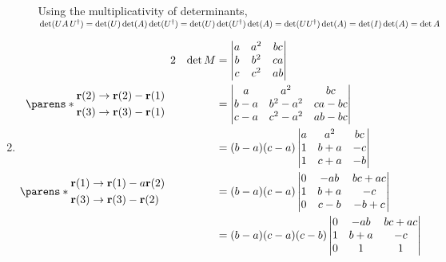 \documentclass[fleqn,a4paper,11pt]{article}
\begin{document}
\begin{enumerate}[label=\textbf{\arabic*.}]
\begin{enumerate}[label=(\roman*)]
      Using the multiplicativity of determinants,
      \(\det(UA\,U^\dag) = \det(U)\det(A)\det(U^\dag)
        = \det(U)\det(U^\dag)\det(A)
        = \det(UU^\dag)\det(A)
        = \det(I) \det(A)
        = \det A
        \)
   \end{enumerate}
  \item
   \begin{alignat*} 2
    && \det M
     &= \begin{vmatrix}
      a & a^2 & bc \\
      b & b^2 & ca \\
      c & c^2 & ab
     \end{vmatrix} \\
    \parens*{
     \begin{aligned}
      \vec r(2) &\to \vec r(2) - \vec r(1) \\
      \vec r(3) &\to \vec r(3) - \vec r(1)
     \end{aligned}} \quad
    && &= \begin{vmatrix}
      a & a^2 & bc \\
      b - a & b^2 - a^2 & ca - bc \\
      c - a & c^2 - a^2 & ab - bc
     \end{vmatrix} \\
    && &= (b - a)(c - a)\begin{vmatrix}
      a & a^2 & bc \\
      1 & b + a & -c \\
      1 & c + a & -b
     \end{vmatrix} \\
    \parens*{
     \begin{aligned}
      \vec r(1) &\to \vec r(1) - a\vec r(2) \\
      \vec r(3) &\to \vec r(3) - \vec r(2)
     \end{aligned}} \quad
    && &= (b - a)(c - a)\begin{vmatrix}
      0 & -ab & bc + ac \\
      1 & b + a & -c \\
      0 & c - b & -b + c
     \end{vmatrix} \\
    && &= (b - a)(c - a)(c - b)\begin{vmatrix}
      0 & -ab & bc + ac \\
      1 & b + a & -c \\
      0 & 1 & 1
     \end{vmatrix} \\

\end{alignat*}
\end{enumerate}
\end{document}
